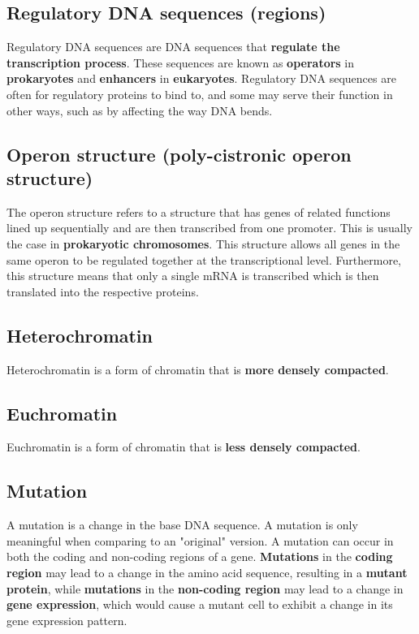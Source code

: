 \documentclass[11pt]{article}
\begin{document}
\subsection{Regulatory DNA sequences (regions)}
\label{sec:org72d94d7}
Regulatory DNA sequences are DNA sequences that \textbf{regulate the transcription process}. These sequences are known as \textbf{operators} in \textbf{prokaryotes} and \textbf{enhancers} in \textbf{eukaryotes}. Regulatory DNA sequences are often for regulatory proteins to bind to, and some may serve their function in other ways, such as by affecting the way DNA bends.

\subsection{Operon structure (poly-cistronic operon structure)}
\label{sec:orge5d1222}
The operon structure refers to a structure that has genes of related functions lined up sequentially and are then transcribed from one promoter. This is usually the case in \textbf{prokaryotic chromosomes}. This structure allows all genes in the same operon to be regulated together at the transcriptional level. Furthermore, this structure means that only a single mRNA is transcribed which is then translated into the respective proteins.

\subsection{Heterochromatin}
\label{sec:orge7abcf3}
Heterochromatin is a form of chromatin that is \textbf{more densely compacted}.

\subsection{Euchromatin}
\label{sec:orga2426bd}
Euchromatin is a form of chromatin that is \textbf{less densely compacted}.

\newpage

\subsection{Mutation}
\label{sec:orgfb122fe}
A mutation is a change in the base DNA sequence. A mutation is only meaningful when comparing to an "original" version. A mutation can occur in both the coding and non-coding regions of a gene. \textbf{Mutations} in the \textbf{coding region} may lead to a change in the amino acid sequence, resulting in a \textbf{mutant protein}, while \textbf{mutations} in the \textbf{non-coding region} may lead to a change in \textbf{gene expression}, which would cause a mutant cell to exhibit a change in its gene expression pattern.
\end{document}

